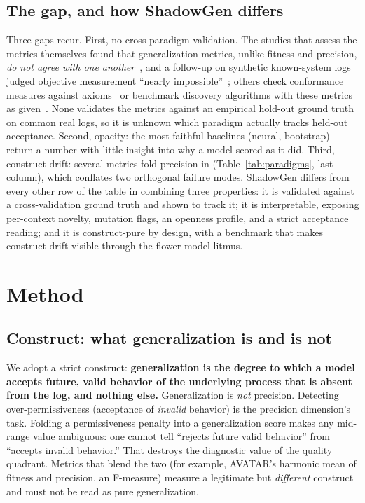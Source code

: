 \documentclass[runningheads]{llncs}
\begin{document}
\subsection{The gap, and how ShadowGen differs}
Three gaps recur. First, no cross-paradigm validation. The studies that assess the metrics themselves found that generalization metrics, unlike fitness and precision, \emph{do not agree with one another}~\cite{janssenswillen2017comparative}, and a follow-up on synthetic known-system logs judged objective measurement ``nearly impossible''~\cite{janssenswillen2019confirmatory}; others check conformance measures against axioms~\cite{vanderaalst2018propositions,syring2019conformance} or benchmark discovery algorithms with these metrics as given~\cite{augusto2019benchmark}. None validates the metrics against an empirical hold-out ground truth on common real logs, so it is unknown which paradigm actually tracks held-out acceptance. Second, opacity: the most faithful baselines (neural, bootstrap) return a number with little insight into why a model scored as it did. Third, construct drift: several metrics fold precision in (Table~\ref{tab:paradigms}, last column), which conflates two orthogonal failure modes. ShadowGen differs from every other row of the table in combining three properties: it is validated against a cross-validation ground truth and shown to track it; it is interpretable, exposing per-context novelty, mutation flags, an openness profile, and a strict acceptance reading; and it is construct-pure by design, with a benchmark that makes construct drift visible through the flower-model litmus.

\section{Method}
\label{sec:method}
\subsection{Construct: what generalization is and is not}
\label{sec:method:construct}
We adopt a strict construct: \textbf{generalization is the degree to which a model accepts future, valid behavior of the underlying process that is absent from the log, and nothing else.} Generalization is \emph{not} precision. Detecting over-permissiveness (acceptance of \emph{invalid} behavior) is the precision dimension's task. Folding a permissiveness penalty into a generalization score makes any mid-range value ambiguous: one cannot tell ``rejects future valid behavior'' from ``accepts invalid behavior.'' That destroys the diagnostic value of the quality quadrant. Metrics that blend the two (for example, AVATAR's harmonic mean of fitness and precision, an F-measure) measure a legitimate but \emph{different} construct and must not be read as pure generalization.
\end{document}
